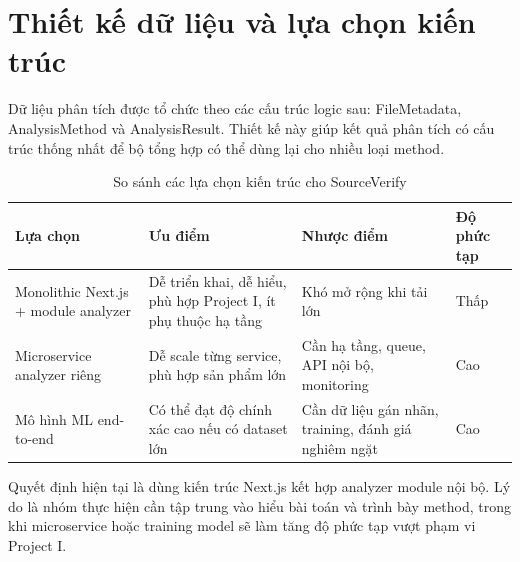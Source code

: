 \section{Thiết kế dữ liệu và lựa chọn kiến trúc}
Dữ liệu phân tích được tổ chức theo các cấu trúc logic sau: FileMetadata, AnalysisMethod và AnalysisResult. Thiết kế này giúp kết quả phân tích có cấu trúc thống nhất để bộ tổng hợp có thể dùng lại cho nhiều loại method.

\begin{table}[h]
\centering
\caption{So sánh các lựa chọn kiến trúc cho SourceVerify}
\label{tab:architecture-tradeoff}
\begin{tabularx}{\textwidth}{p{}Y Y p{0.14\textwidth}}
\toprule
\textbf{Lựa chọn} & \textbf{Ưu điểm} & \textbf{Nhược điểm} & \textbf{Độ phức tạp} \\
\midrule
Monolithic Next.js + module analyzer & Dễ triển khai, dễ hiểu, phù hợp Project I, ít phụ thuộc hạ tầng & Khó mở rộng khi tải lớn & Thấp \\
Microservice analyzer riêng & Dễ scale từng service, phù hợp sản phẩm lớn & Cần hạ tầng, queue, API nội bộ, monitoring & Cao \\
Mô hình ML end-to-end & Có thể đạt độ chính xác cao nếu có dataset lớn & Cần dữ liệu gán nhãn, training, đánh giá nghiêm ngặt & Cao \\
\bottomrule
\end{tabularx}
\end{table}

Quyết định hiện tại là dùng kiến trúc Next.js kết hợp analyzer module nội bộ. Lý do là nhóm thực hiện cần tập trung vào hiểu bài toán và trình bày method, trong khi microservice hoặc training model sẽ làm tăng độ phức tạp vượt phạm vi Project I.
